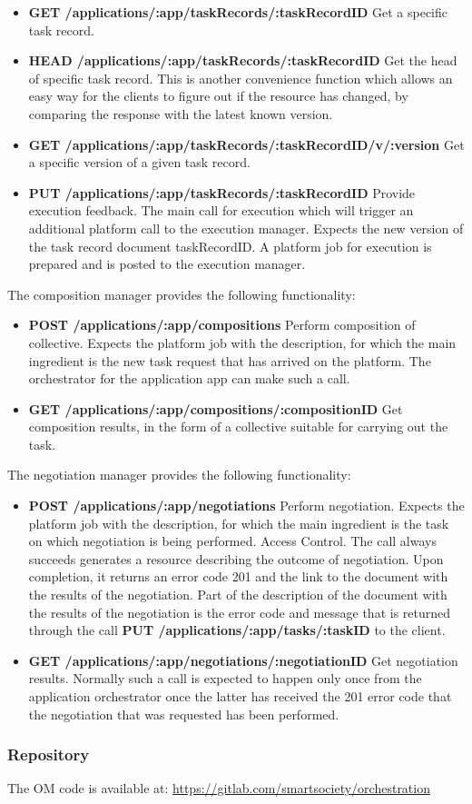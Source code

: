 \begin{itemize}
\item {\bf GET /applications/:app/taskRecords/:taskRecordID} Get a specific task record.
\item {\bf HEAD /applications/:app/taskRecords/:taskRecordID} Get the head of specific task record. This is another convenience function which allows an easy way for the clients to figure out if the resource has changed, by comparing the response with the latest known version.
\item {\bf GET /applications/:app/taskRecords/:taskRecordID/v/:version} Get a specific version of a given task record.
\item {\bf PUT /applications/:app/taskRecords/:taskRecordID} Provide execution feedback. The main call for execution which will trigger an additional platform call to the execution manager. Expects the new version of the task record document taskRecordID. A platform job for execution is prepared and is posted to the execution manager.
\end{itemize}
The composition manager provides the following functionality:
\begin{itemize}
\item {\bf POST /applications/:app/compositions} Perform composition of collective. Expects the platform job with the description, for which the main ingredient is the new task request that has arrived on the platform. The orchestrator for the application app can make such a call.
\item {\bf GET /applications/:app/compositions/:compositionID} Get composition results, in the form of a collective suitable for carrying out the task. %
\end{itemize}
The negotiation manager provides the following functionality:
\begin{itemize}
\item {\bf POST /applications/:app/negotiations} Perform negotiation. Expects the platform job with the description, for which the main ingredient is the task on which negotiation is being performed.
Access Control. The call always succeeds generates a resource describing the outcome of negotiation. Upon completion, it returns an error code 201 and the link to the document with the results of the negotiation. Part of the description of the document with the results of the negotiation is the error code and message that is returned through the call {\bf PUT /applications/:app/tasks/:taskID} to the client.
\item {\bf GET /applications/:app/negotiations/:negotiationID} Get negotiation results. Normally such a call is expected to happen only once from the application orchestrator once the latter has received the 201 error code that the negotiation that was requested has been performed.
\end{itemize}
\subsubsection{Repository}
The OM code is available at: \url{https://gitlab.com/smartsociety/orchestration}